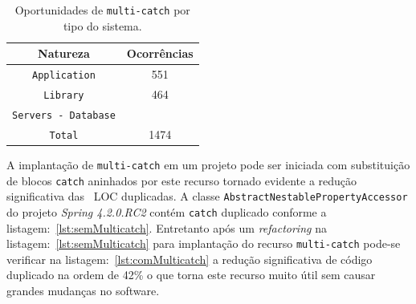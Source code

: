\begin{table}[h]
	\centering
	\caption{Oportunidades de \texttt{multi-catch} por tipo do sistema.}
	\begin{tabular}{cc}
		\hline
		Natureza & Ocorrências \\ 
		\hline \hline
		\texttt{Application} & 551 \\ 
		\texttt{Library} &  464 \\ 
		\texttt{Servers - Database} &  \\ \hline
		\texttt{Total} &  1474 \\ \hline
	\end{tabular}
	\label{tab:oportunidadesMulticatch} %
\end{table}
		
A implantação de \texttt{multi-catch} em um projeto pode ser iniciada com substituição de blocos \texttt{catch} aninhados por este recurso tornado evidente a redução significativa das ~\acs{LOC} duplicadas. A classe \texttt{AbstractNestablePropertyAccessor} do projeto  \textit{Spring 4.2.0.RC2} contém \texttt{catch} duplicado conforme a listagem:~\ref{lst:semMulticatch}. Entretanto após um \textit{refactoring} na listagem:~\ref{lst:semMulticatch} para implantação do recurso \texttt{multi-catch} pode-se verificar na listagem:~\ref{lst:comMulticatch} a redução significativa de código duplicado na ordem de \num{42}\% o que torna este recurso muito útil sem causar grandes mudanças no software.


